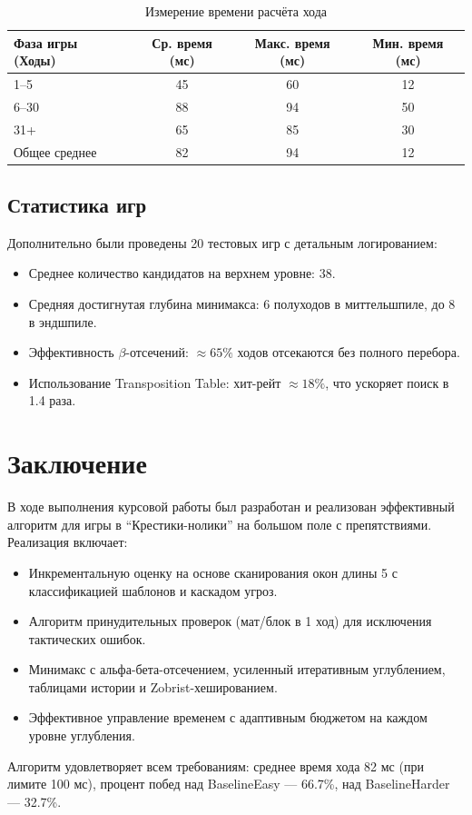 \documentclass[a4paper,14pt]{extreport}
\begin{document}
\begin{table}[H]
\centering
\caption{Измерение времени расчёта хода}
\begin{tabularx}{\linewidth}{@{} lccc @{}}
\toprule
Фаза игры (Ходы) & Ср. время (мс) & Макс. время (мс) & Мин. время (мс) \\
\midrule
1–5  & 45 & 60 & 12 \\
6–30 & 88 & 94 & 50 \\
31+  & 65 & 85 & 30 \\
Общее среднее & 82 & 94 & 12 \\
\bottomrule
\end{tabularx}
\end{table}

\section{Статистика игр}
Дополнительно были проведены 20 тестовых игр с детальным логированием:
\begin{itemize}
    \item Среднее количество кандидатов на верхнем уровне: 38.
    \item Средняя достигнутая глубина минимакса: 6 полуходов в миттельшпиле, до 8 в эндшпиле.
    \item Эффективность $\beta$-отсечений: $\approx 65\%$ ходов отсекаются без полного перебора.
    \item Использование Transposition Table: хит-рейт $\approx 18\%$, что ускоряет поиск в 1.4 раза.
\end{itemize}

\chapter*{Заключение}
В ходе выполнения курсовой работы был разработан и реализован эффективный алгоритм для игры в ``Крестики-нолики'' на большом поле с препятствиями. Реализация включает:
\begin{itemize}
    \item Инкрементальную оценку на основе сканирования окон длины 5 с классификацией шаблонов и каскадом угроз.
    \item Алгоритм принудительных проверок (мат/блок в 1 ход) для исключения тактических ошибок.
    \item Минимакс с альфа-бета-отсечением, усиленный итеративным углублением, таблицами истории и Zobrist-хешированием.
    \item Эффективное управление временем с адаптивным бюджетом на каждом уровне углубления.
\end{itemize}
Алгоритм удовлетворяет всем требованиям: среднее время хода 82 мс (при лимите 100 мс), процент побед над BaselineEasy — 66.7\%, над BaselineHarder — 32.7\%.
\end{document}

